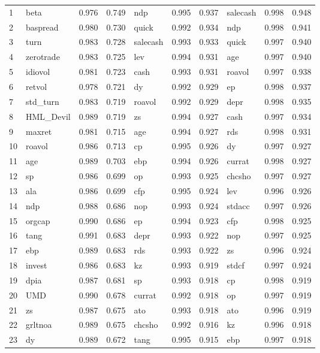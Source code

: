 \begin{landscape}
\begin{footnotesize}
\begin{longtable}{l|lcc|lcc|lcc}
		1  & beta & 0.976 & 0.749 & ndp & 0.995 & 0.937 & salecash & 0.998 & 0.948 \\ 
  2 & baspread & 0.980 & 0.730 & quick & 0.992 & 0.934 & ndp & 0.998 & 0.941 \\ 
  3 & turn & 0.983 & 0.728 & salecash & 0.993 & 0.933 & quick & 0.997 & 0.940 \\ 
  4 & zerotrade & 0.983 & 0.725 & lev & 0.994 & 0.931 & age & 0.997 & 0.940 \\ 
  5 & idiovol & 0.981 & 0.723 & cash & 0.993 & 0.931 & roavol & 0.997 & 0.938 \\ 
  6 & retvol & 0.978 & 0.721 & dy & 0.992 & 0.929 & ep & 0.998 & 0.937 \\ 
  7 & std\_turn & 0.983 & 0.719 & roavol & 0.992 & 0.929 & depr & 0.998 & 0.935 \\ 
  8 & HML\_Devil & 0.989 & 0.719 & zs & 0.994 & 0.927 & cash & 0.997 & 0.934 \\ 
  9 & maxret & 0.981 & 0.715 & age & 0.994 & 0.927 & rds & 0.998 & 0.931 \\ 
  10 & roavol & 0.986 & 0.713 & cp & 0.995 & 0.926 & dy & 0.997 & 0.927 \\ 
  11 & age & 0.989 & 0.703 & ebp & 0.994 & 0.926 & currat & 0.998 & 0.927 \\ 
  12 & sp & 0.986 & 0.699 & op & 0.993 & 0.925 & chcsho & 0.997 & 0.927 \\ 
  13 & ala & 0.986 & 0.699 & cfp & 0.995 & 0.924 & lev & 0.996 & 0.926 \\ 
  14 & ndp & 0.988 & 0.686 & nop & 0.993 & 0.924 & stdacc & 0.997 & 0.926 \\ 
  15 & orgcap & 0.990 & 0.686 & ep & 0.994 & 0.923 & cfp & 0.998 & 0.925 \\ 
  16 & tang & 0.991 & 0.683 & depr & 0.993 & 0.922 & nop & 0.997 & 0.925 \\ 
  17 & ebp & 0.989 & 0.683 & rds & 0.993 & 0.922 & zs & 0.996 & 0.924 \\ 
  18 & invest & 0.986 & 0.683 & kz & 0.993 & 0.919 & stdcf & 0.997 & 0.924 \\ 
  19 & dpia & 0.987 & 0.681 & sp & 0.993 & 0.918 & cp & 0.998 & 0.919 \\ 
  20 & UMD & 0.990 & 0.678 & currat & 0.992 & 0.918 & op & 0.997 & 0.919 \\ 
  21 & zs & 0.987 & 0.675 & ato & 0.993 & 0.918 & ato & 0.996 & 0.919 \\ 
  22 & grltnoa & 0.989 & 0.675 & chcsho & 0.992 & 0.916 & kz & 0.996 & 0.918 \\ 
  23 & dy & 0.989 & 0.672 & tang & 0.995 & 0.915 & ebp & 0.997 & 0.918 \\ 

\end{longtable}
\end{footnotesize}
\end{landscape}
